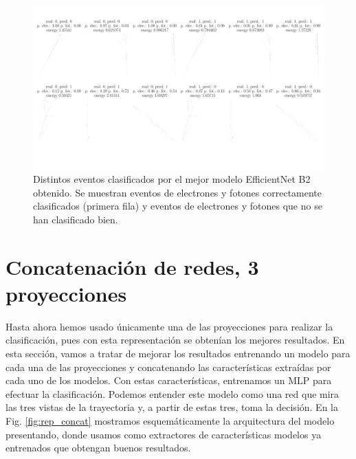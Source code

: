 \documentclass[a4paper,12pt,oneside,titlepage]{book}
\begin{document}
\begin{figure}[h!]
  \centering
  \includegraphics[scale=0.45, center]{muchas.pdf}
  \caption{Distintos eventos clasificados por el mejor modelo EfficientNet B2 obtenido. Se muestran eventos de electrones y fotones correctamente clasificados (primera fila) y eventos de electrones y fotones que no se han clasificado bien.}
  \label{fig:muchas}
\end{figure}


\section{Concatenación de redes, 3 proyecciones}
\label{sec:3_proy}

Hasta ahora hemos usado únicamente una de las proyecciones para realizar la clasificación, pues con esta representación se obtenían los mejores resultados. En esta sección, vamos a tratar de mejorar los resultados entrenando un modelo para cada una de las proyecciones y concatenando las características extraídas por cada uno de los modelos. Con estas características, entrenamos un MLP para efectuar la clasificación. Podemos entender este modelo como una red que mira las tres vistas de la trayectoria y, a partir de estas tres, toma la decisión. En la Fig. \ref{fig:rep_concat} mostramos esquemáticamente la arquitectura del modelo presentando, donde usamos como extractores de características modelos ya entrenados que obtengan buenos resultados.
\end{document}
